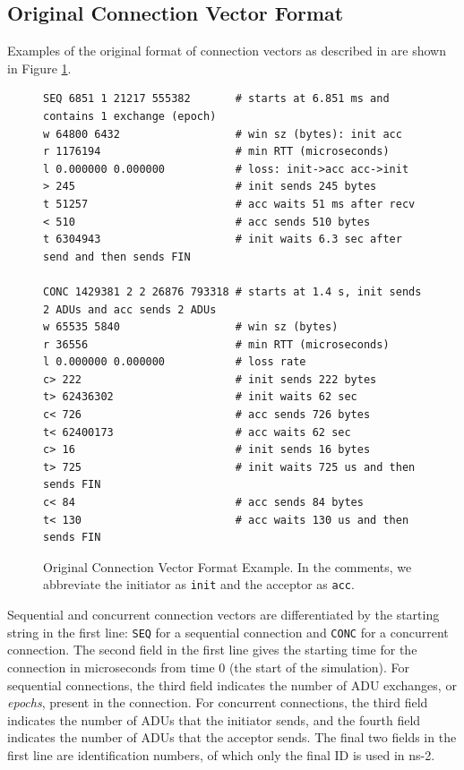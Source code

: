 
\subsection{Original Connection Vector Format}

Examples of the original format of connection vectors as described in
\cite{weigle-ccr06} are shown in Figure \ref{orig-cvec}.
\begin{figure}
\makebox[\columnwidth]{\hrulefill}
\small
\begin{verbatim}
SEQ 6851 1 21217 555382       # starts at 6.851 ms and contains 1 exchange (epoch)
w 64800 6432                  # win sz (bytes): init acc
r 1176194                     # min RTT (microseconds)
l 0.000000 0.000000           # loss: init->acc acc->init
> 245                         # init sends 245 bytes
t 51257                       # acc waits 51 ms after recv
< 510                         # acc sends 510 bytes
t 6304943                     # init waits 6.3 sec after send and then sends FIN

CONC 1429381 2 2 26876 793318 # starts at 1.4 s, init sends 2 ADUs and acc sends 2 ADUs
w 65535 5840                  # win sz (bytes)
r 36556                       # min RTT (microseconds)
l 0.000000 0.000000           # loss rate
c> 222                        # init sends 222 bytes
t> 62436302                   # init waits 62 sec
c< 726                        # acc sends 726 bytes
t< 62400173                   # acc waits 62 sec
c> 16                         # init sends 16 bytes
t> 725                        # init waits 725 us and then sends FIN
c< 84                         # acc sends 84 bytes
t< 130                        # acc waits 130 us and then sends FIN
\end{verbatim}
\makebox[\columnwidth]{\hrulefill}
\caption{\label{orig-cvec}Original Connection Vector Format Example.
In the comments, we abbreviate the initiator as \texttt{init} and the
acceptor as \texttt{acc}.}
\end{figure}
Sequential and concurrent connection vectors are differentiated by the
starting string in the first line: \texttt{SEQ} for a sequential
connection and \texttt{CONC} for a concurrent connection.  The second
field in the first line gives the starting time for the connection in
microseconds from time 0 (the start of the simulation).  For sequential connections, the third field indicates
the number of ADU exchanges, or \emph{epochs}, present in the
connection.  For concurrent connections, the third field indicates the
number of ADUs that the initiator sends, and the fourth field indicates
the number of ADUs that the acceptor sends. The final two fields in
the first line are identification numbers, of which only the final ID
is used in ns-2.

